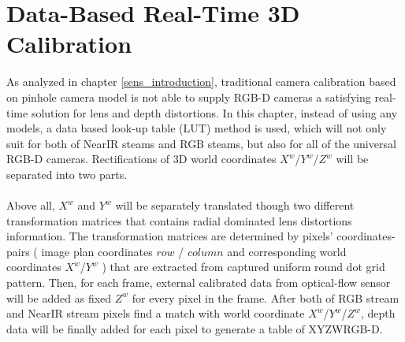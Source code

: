 %
\chapter{Data-Based Real-Time 3D Calibration} %
\label{sens_Rectification} %
As analyzed in chapter \ref{sens_introduction}, traditional camera calibration based on pinhole camera model is not able to supply RGB-D cameras a satisfying real-time solution for lens and depth distortions. In this chapter, instead of using any models, a data based look-up table (LUT) method is used, which will not only suit for both of NearIR steams and RGB steams, but also for all of the universal RGB-D cameras. Rectifications of 3D world coordinates \(X^{w}\)/\(Y^{w}\)/\(Z^{w}\) will be separated into two parts. 
\\\\%
Above all, \(X^{w}\) and \(Y^{w}\) will be separately translated though two different transformation matrices that contains radial dominated lens distortions information. The transformation matrices are determined by pixels' coordinates-pairs ( image plan coordinates \(row\) / \(column\) and corresponding world coordinates \(X^{w}\)/\(Y^{w}\) ) that are extracted from captured uniform round dot grid pattern. Then, for each frame, external calibrated data from optical-flow sensor will be added as fixed \(Z^{w}\) for every pixel in the frame. After both of RGB stream and NearIR stream pixels find a match with world coordinate \(X^{w}\)/\(Y^{w}\)/\(Z^{w}\), depth data will be finally added for each pixel to generate a table of XYZWRGB-D.

